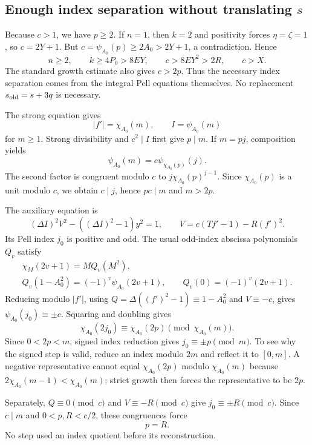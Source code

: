 \documentclass[11pt,a4paper]{article}
\theoremstyle{definition}
\theoremstyle{remark}
\numberwithin{equation}{section}
\begin{document}
\subsection{Enough index separation without translating \texorpdfstring{$s$}{s}}

Because $c>1$, we have $p\ge2$. If $n=1$, then $k=2$ and
positivity forces $\eta=\zeta=1$, so $c=2Y+1$. But
$c=\psi_{A_0}(p)\ge2A_0>2Y+1$, a contradiction. Hence
\begin{equation}
 n\ge2,\qquad k\ge4P_0>8EY,\qquad
 c>8EY^2>2R,\qquad c>X.
 \label{eq:recoveredlarge}
\end{equation}
The standard growth estimate also gives $c>2p$.
Thus the necessary index separation comes from the integral Pell
equations themselves. No replacement $s_{\rm old}=s+3q$ is necessary.

The strong equation gives
\[
 |f'|=\chi_{A_0}(m),\qquad I=\psi_{A_0}(m)
\]
for $m\ge1$. Strong divisibility and $c^2\mid I$ first give
$p\mid m$. If $m=pj$, composition yields
\[
 \psi_{A_0}(m)=c\psi_{\chi_{A_0}(p)}(j).
\]
The second factor is congruent modulo $c$ to
$j\chi_{A_0}(p)^{j-1}$. Since $\chi_{A_0}(p)$ is a unit modulo
$c$, we obtain $c\mid j$, hence $pc\mid m$ and $m>2p$.

The auxiliary equation is
\[
 (\Delta I)^2V^2-((\Delta I)^2-1)y^2=1,
 \qquad V=c(Tf'-1)-R(f')^2.
\]
Its Pell index $j_0$ is positive and odd. The usual odd-index
abscissa polynomials $Q_v$ satisfy
\begin{gather*}
 \chi_M(2v+1)=M Q_v(M^2),\\
 Q_v(1-A_0^2)=(-1)^v\psi_{A_0}(2v+1),\qquad
 Q_v(0)=(-1)^v(2v+1).
\end{gather*}
Reducing modulo $|f'|$, using
$Q=\Delta((f')^2-1)\equiv1-A_0^2$ and $V\equiv-c$,
gives $\psi_{A_0}(j_0)\equiv\pm c$. Squaring and doubling gives
\[
 \chi_{A_0}(2j_0)\equiv\chi_{A_0}(2p)
 \pmod{\chi_{A_0}(m)}.
\]
Since $0<2p<m$, signed index reduction gives
$j_0\equiv\pm p\pmod m$. To see why the signed step is valid,
reduce an index modulo $2m$ and reflect it to $[0,m]$. A negative
representative cannot equal $\chi_{A_0}(2p)$ modulo $\chi_{A_0}(m)$
because $2\chi_{A_0}(m-1)<\chi_{A_0}(m)$; strict growth then
forces the representative to be $2p$.

Separately, $Q\equiv0\pmod c$ and $V\equiv-R\pmod c$
give $j_0\equiv\pm R\pmod c$. Since $c\mid m$ and
$0<p,R<c/2$, these congruences force
\begin{equation}
 p=R.\label{eq:pR}
\end{equation}
No step used an index quotient before its reconstruction.
\end{document}
